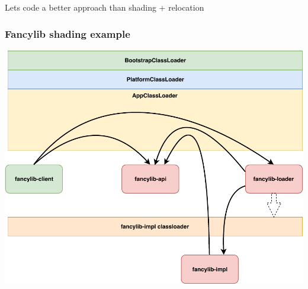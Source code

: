 \documentclass[aspectratio=169]{beamer}
\begin{document}
\begin{frame}
    \begin{center}
    Lets code a better approach than shading + relocation
    \end{center}
\end{frame}

\begin{frame}
	\frametitle{Fancylib shading example}
	\begin{center}
	    \includegraphics[scale=0.45]{assets/AllGraphicsTalk-shading.pdf}
	\end{center}
\end{frame}
\end{document}
